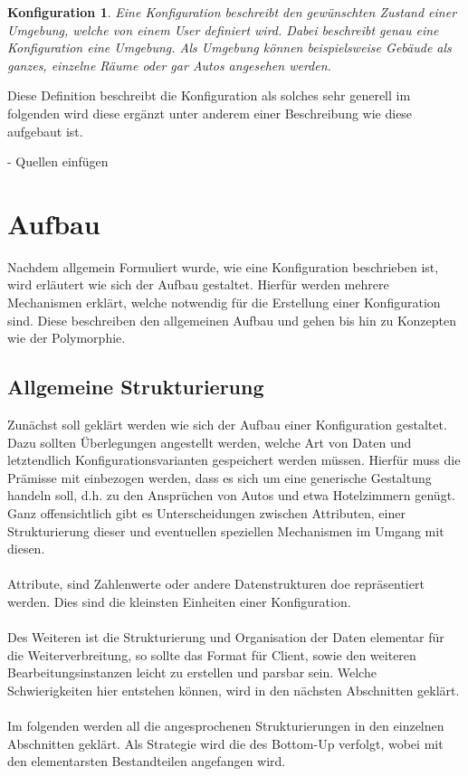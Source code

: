 \newtheorem{mydef}{Konfiguration}
\begin{mydef}
Eine Konfiguration beschreibt den gewünschten Zustand einer Umgebung, welche von einem User definiert wird. Dabei beschreibt genau eine Konfiguration eine Umgebung. Als
Umgebung können beispielsweise Gebäude als ganzes, einzelne Räume oder gar Autos angesehen werden.
\end{mydef}

Diese Definition beschreibt die Konfiguration als solches sehr generell im folgenden wird diese ergänzt unter anderem einer Beschreibung wie diese aufgebaut ist. 

- Quellen einfügen 

\section{Aufbau}
Nachdem allgemein Formuliert wurde, wie eine Konfiguration beschrieben ist, wird erläutert wie sich der Aufbau gestaltet. Hierfür werden mehrere Mechanismen erklärt, welche notwendig für die Erstellung einer Konfiguration sind. Diese beschreiben den allgemeinen Aufbau und gehen bis hin zu Konzepten wie der Polymorphie. 

\subsection{Allgemeine Strukturierung}
Zunächst soll geklärt werden wie sich der Aufbau einer Konfiguration gestaltet. Dazu sollten Überlegungen angestellt werden, welche Art von Daten und letztendlich Konfigurationsvarianten gespeichert werden müssen. Hierfür muss die Prämisse mit einbezogen werden, dass es sich um eine generische Gestaltung handeln soll, d.h. zu den Ansprüchen von Autos und etwa Hotelzimmern genügt. 
Ganz offensichtlich gibt es Unterscheidungen zwischen Attributen, einer Strukturierung dieser und eventuellen speziellen Mechanismen im Umgang mit diesen.
\\\\
Attribute, sind Zahlenwerte oder andere Datenstrukturen doe repräsentiert werden. Dies sind die kleinsten Einheiten einer Konfiguration.
\\\\
Des Weiteren ist die Strukturierung und Organisation der Daten elementar für die Weiterverbreitung, so sollte das Format für Client, sowie den weiteren Bearbeitungsinstanzen leicht zu erstellen und parsbar sein. Welche Schwierigkeiten hier entstehen können, wird in den nächsten Abschnitten geklärt. 
\\\\
Im folgenden werden all die angesprochenen Strukturierungen in den einzelnen Abschnitten geklärt. Als Strategie wird die des Bottom-Up verfolgt, wobei mit den elementarsten Bestandteilen angefangen wird. 

